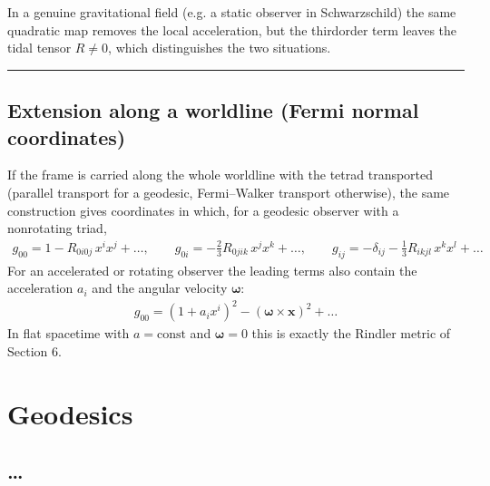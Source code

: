 \documentclass[letterpaper,10pt,english]{jupyterBook}
\begin{document}
\sphinxAtStartPar
In a genuine gravitational field (e.g. a static observer in Schwarzschild) the same quadratic map removes the local acceleration, but the third\sphinxhyphen{}order term leaves the tidal tensor \(R\neq0\), which distinguishes the two situations.


\bigskip\hrule\bigskip



\subsection{Extension along a worldline (Fermi normal coordinates)}
\label{\detokenize{ch/relativity-general/local-inertial-reference-frame-and-equivalence-principle:extension-along-a-worldline-fermi-normal-coordinates}}
\sphinxAtStartPar
If the frame is carried along the whole worldline with the tetrad transported (parallel transport for a geodesic, Fermi–Walker transport otherwise), the same construction gives coordinates in which, for a geodesic observer with a non\sphinxhyphen{}rotating triad,
\begin{equation*}
\begin{split}
g_{00}=1-R_{0i0j}\,x^ix^j+\dots,\qquad g_{0i}=-\tfrac23R_{0jik}\,x^jx^k+\dots,\qquad g_{ij}=-\delta_{ij}-\tfrac13R_{ikjl}\,x^kx^l+\dots
\end{split}
\end{equation*}
\sphinxAtStartPar
For an accelerated or rotating observer the leading terms also contain the acceleration \(a_i\) and the angular velocity \(\boldsymbol\omega\):
\begin{equation*}
\begin{split}
g_{00}=(1+a_ix^i)^2-(\boldsymbol\omega\times\mathbf x)^2+\dots
\end{split}
\end{equation*}
\sphinxAtStartPar
In flat spacetime with \(a=\text{const}\) and \(\boldsymbol\omega=0\) this is exactly the Rindler metric of Section 6.

\sphinxstepscope


\section{Geodesics}
\label{\detokenize{ch/relativity-general/geodesics:geodesics}}\label{\detokenize{ch/relativity-general/geodesics:general-relativity-geodesics}}\label{\detokenize{ch/relativity-general/geodesics::doc}}

\subsection{…}
\label{\detokenize{ch/relativity-general/geodesics:id1}}
\end{document}
